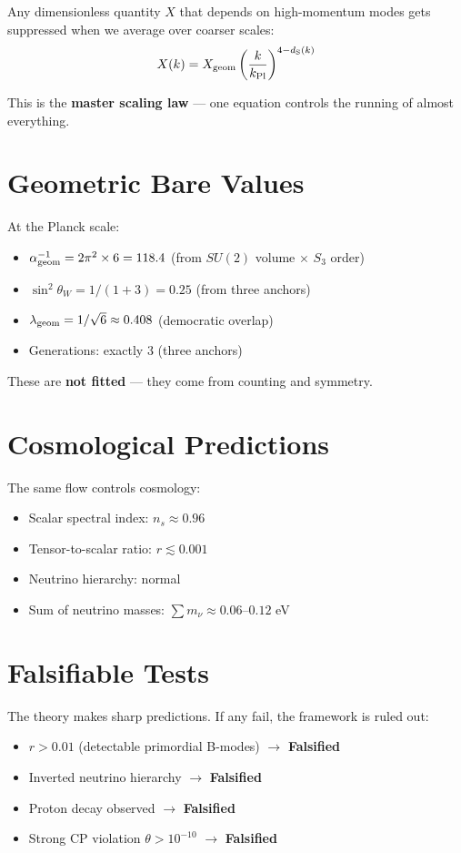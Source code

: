 \documentclass[11pt, a4paper, openany]{book}
\newcommand{\dS}{d_{\mathrm{S}}}
\begin{document}
Any dimensionless quantity $X$ that depends on high-momentum modes gets suppressed when we average over coarser scales:
\begin{equation}
X(k) = X_{\rm geom} \left( \frac{k}{k_{\rm Pl}} \right)^{4 - \dS(k)}
\end{equation}

This is the \textbf{master scaling law} --- one equation controls the running of almost everything.

\section{Geometric Bare Values}

At the Planck scale:
\begin{itemize}
  \item $\alpha_{\rm geom}^{-1} = 2\pi^2 \times 6 = 118.4$ (from $SU(2)$ volume $\times$ $S_3$ order)
  \item $\sin^2\theta_W = 1/(1+3) = 0.25$ (from three anchors)
  \item $\lambda_{\rm geom} = 1/\sqrt{6} \approx 0.408$ (democratic overlap)
  \item Generations: exactly 3 (three anchors)
\end{itemize}

These are \textbf{not fitted} --- they come from counting and symmetry.

\section{Cosmological Predictions}

The same flow controls cosmology:
\begin{itemize}
  \item Scalar spectral index: $n_s \approx 0.96$
  \item Tensor-to-scalar ratio: $r \lesssim 0.001$
  \item Neutrino hierarchy: normal
  \item Sum of neutrino masses: $\sum m_\nu \approx 0.06$--$0.12$ eV
\end{itemize}

\section{Falsifiable Tests}

The theory makes sharp predictions. If any fail, the framework is ruled out:
\begin{itemize}
  \item $r > 0.01$ (detectable primordial B-modes) $\to$ \textbf{Falsified}
  \item Inverted neutrino hierarchy $\to$ \textbf{Falsified}
  \item Proton decay observed $\to$ \textbf{Falsified}
  \item Strong CP violation $\theta > 10^{-10}$ $\to$ \textbf{Falsified}
\end{itemize}
\end{document}
